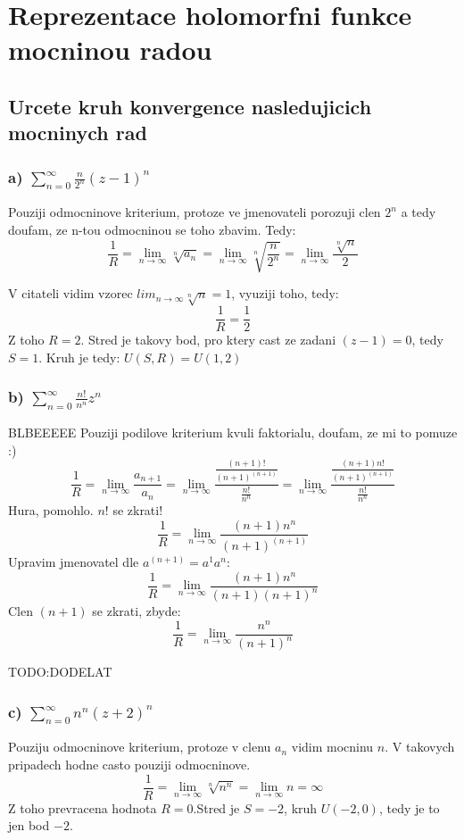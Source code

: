 \chapter{Reprezentace holomorfni funkce mocninou radou}

\section{Urcete kruh konvergence nasledujicich mocninych rad}

\subsection{a) $\sum_{n=0}^{\infty} \frac{n}{2^n}(z-1)^n$}
Pouziji odmocninove kriterium, protoze ve jmenovateli porozuji clen $2^n$ a tedy doufam, ze n-tou odmocninou se toho zbavim. Tedy:
$$\frac{1}{R} = \lim_{n \to \infty} \sqrt[n]{a_n} = \lim_{n \to \infty} \sqrt[n]{\frac{n}{2^n}}=\lim_{n \to \infty} \frac{\sqrt[n]{n}}{2}$$

V citateli vidim vzorec $lim_{n \to \infty} \sqrt[n]{n} =1$, vyuziji toho, tedy:
$$\frac{1}{R} = \frac{1}{2}$$
Z toho $R=2$. Stred je takovy bod, pro ktery cast ze zadani $(z-1) =0$, tedy $S=1$. Kruh je tedy:
$U(S,R) = U(1,2)$

\subsection{b) $\sum_{n=0}^\infty \frac{n!}{n^n}z^n$}
BLBEEEEE
Pouziji podilove kriterium kvuli faktorialu, doufam, ze mi to pomuze :)
$$\frac{1}{R} = \lim_{n \to \infty} \frac{a_{n+1}}{a_n} = \lim_{n \to \infty} \frac{\frac{(n+1)!}{(n+1)^{(n+1)}}}{\frac{n!}{n^n}} = \lim_{n \to \infty} \frac{\frac{(n+1)n!}{(n+1)^{(n+1)}}}{\frac{n!}{n^n}}$$
Hura, pomohlo. $n!$ se zkrati!
$$\frac{1}{R} = \lim_{n \to \infty} \frac{(n+1)n^n}{(n+1)^{(n+1)}}$$
Upravim jmenovatel dle $a^{(n+1)} = a^1 a^n$:
$$\frac{1}{R} = \lim_{n \to \infty} \frac{(n+1)n^n}{(n+1)(n+1)^n}$$
Clen $(n+1)$ se zkrati, zbyde:
$$\frac{1}{R} = \lim_{n \to \infty} \frac{n^n}{(n+1)^n}$$

TODO:DODELAT

\subsection{c) $\sum_{n=0}^\infty n^n (z+2)^n$ }
Pouziju odmocninove kriterium, protoze v clenu $a_n$ vidim mocninu $n$. V takovych pripadech hodne casto pouziji odmocninove.
$$\frac{1}{R} = \lim_{n \to \infty} \sqrt[n]{n^n} = \lim_{n \to \infty} n = \infty$$
Z toho prevracena hodnota $R=0$.Stred je $S=-2$, kruh $U(-2,0)$, tedy je to jen bod ${-2}$.

